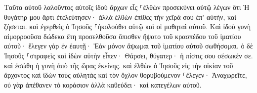 \documentclass{openreader}
\begin{document}
Ταῦτα αὐτοῦ λαλοῦντος αὐτοῖς ἰδοὺ ἄρχων εἷς ⸀ἐλθὼν προσεκύνει αὐτῷ λέγων ὅτι Ἡ θυγάτηρ μου ἄρτι ἐτελεύτησεν· ἀλλὰ ἐλθὼν ἐπίθες τὴν χεῖρά σου ἐπ’ αὐτήν, καὶ ζήσεται. 
καὶ ἐγερθεὶς ὁ Ἰησοῦς ⸀ἠκολούθει αὐτῷ καὶ οἱ μαθηταὶ αὐτοῦ. 
Καὶ ἰδοὺ γυνὴ αἱμορροοῦσα δώδεκα ἔτη προσελθοῦσα ὄπισθεν ἥψατο τοῦ κρασπέδου τοῦ ἱματίου αὐτοῦ· 
ἔλεγεν γὰρ ἐν ἑαυτῇ· Ἐὰν μόνον ἅψωμαι τοῦ ἱματίου αὐτοῦ σωθήσομαι. 
ὁ δὲ Ἰησοῦς ⸀στραφεὶς καὶ ἰδὼν αὐτὴν εἶπεν· Θάρσει, θύγατερ· ἡ πίστις σου σέσωκέν σε. καὶ ἐσώθη ἡ γυνὴ ἀπὸ τῆς ὥρας ἐκείνης. 
καὶ ἐλθὼν ὁ Ἰησοῦς εἰς τὴν οἰκίαν τοῦ ἄρχοντος καὶ ἰδὼν τοὺς αὐλητὰς καὶ τὸν ὄχλον θορυβούμενον 
⸀ἔλεγεν· Ἀναχωρεῖτε, οὐ γὰρ ἀπέθανεν τὸ κοράσιον ἀλλὰ καθεύδει· καὶ κατεγέλων αὐτοῦ. 
\end{document}

